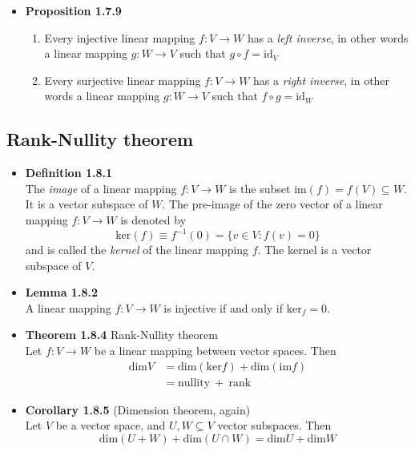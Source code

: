 \documentclass[11pt,a4paper]{article}
\begin{document}
\begin{itemize}
    \item \textbf{Proposition 1.7.9}
        \begin{enumerate}
            \item Every injective linear mapping $f : V \to W$ has a \emph{left inverse},
                in other words a linear mapping $g : W \to V$ such that $g \circ f = \text{id}_V$
            \item Every surjective linear mapping $f: V \to W$ has a \emph{right inverse},
                in other words a linear mapping $g : W \to V$ such that $f \circ g = \text{id}_W$
        \end{enumerate}
\end{itemize}

\subsection{Rank-Nullity theorem}

\begin{itemize}

    \item \textbf{Definition 1.8.1} \\
        The \emph{image} of a linear mapping $f : V \to W$ is the subset
        $\text{im}(f) = f(V) \subseteq W$.
        It is a vector subspace of $W$.
        The pre-image of the zero vector of a linear mapping $f : V \to W$ is denoted by
        \[
            \text{ker}(f) \equiv f^{-1}(0) = \{v \in V : f(v) = 0 \}
        \]
        and is called the \emph{kernel} of the linear mapping $f$.
        The kernel is a vector subspace of $V$.

    \item \textbf{Lemma 1.8.2} \\
        A linear mapping $f : V \to W$ is injective if and only if $\text{ker}_f = 0$.

    \item \textbf{Theorem 1.8.4} Rank-Nullity theorem \\
        Let $f : V \to W$ be a linear mapping between vector spaces. Then
        \begin{align*}{}
            \text{dim}V &= \text{dim}(\text{ker}f) + \text{dim}(\text{im}f) \\
                        &= \text{nullity} \ + \ \text{rank}
        \end{align*}

    \item \textbf{Corollary 1.8.5} (Dimension theorem, again) \\
        Let $V$ be a vector space, and $U,W \subseteq V$ vector subspaces. Then
        \[
            \text{dim}(U + W) + \text{dim}(U \cap W) = \text{dim}U + \text{dim}W
        \]
\end{itemize}
\end{document}

